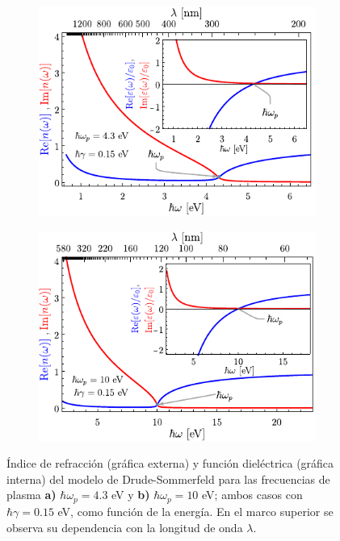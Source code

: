 	\begin{figure}[h!]\centering\hspace*{-1.5em}
	\begin{subfigure}{.01\linewidth}\caption{}\label{sfig:Drude4eV}\vspace{3.75cm}\end{subfigure}
	\begin{subfigure}{.45\linewidth}\hspace*{-1.3em}
	\includegraphics[scale=1]{1-Teoria/figs/1-4-varepsn4eV.pdf}
	\end{subfigure}
	\begin{subfigure}{.01\linewidth}\caption{}\label{sfig:Drude10eV}\vspace{3.75cm}\end{subfigure}
	\begin{subfigure}{.45\linewidth}\hspace*{-1em}
	\includegraphics[scale=1 ]{1-Teoria/figs/1-4-varepsn10eV.pdf}
	\end{subfigure}\vspace*{-.7em}
	\caption{ Índice de refracción (gráfica externa) y función dieléctrica (gráfica interna) del modelo de Drude-Sommerfeld para las frecuencias de plasma \textbf{a)} $\hbar\omega_p=4. 3$ eV y \textbf{b)} $\hbar\omega_p=10$ eV; ambos casos con $\hbar\gamma=0. 15$ eV, como función de la energía.  En el marco superior se observa su dependencia con la longitud de onda $\lambda$. }\label{fig:Drude}
	\end{figure}	

